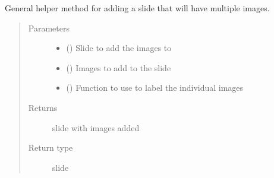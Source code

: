 \documentclass[letterpaper,10pt,english]{sphinxmanual}
\begin{document}
\begin{fulllineitems}
\begin{fulllineitems}
\begin{quote}
\begin{description}
\end{description}\end{quote}

\end{fulllineitems}


\begin{fulllineitems}
\label{\detokenize{polo.utils:polo.utils.io_utils.PptxWriter.add_multi_image_slide}}
General helper method for adding a slide that will have multiple
images.
\begin{quote}\begin{description}
\item[{Parameters}] \leavevmode\begin{itemize}
\item {} 
 () \textendash{} Slide to add the images to

\item {} 
 () \textendash{} Images to add to the slide

\item {} 
 () \textendash{} Function to use to label the individual images

\end{itemize}

\item[{Returns}] \leavevmode
slide with images added

\item[{Return type}] \leavevmode
slide

\end{description}\end{quote}

\end{fulllineitems}



\end{fulllineitems}
\end{document}
